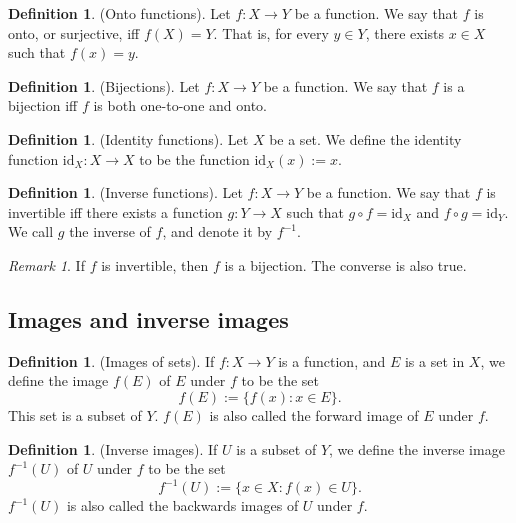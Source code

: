 \documentclass[12pt]{article}
\theoremstyle{definition}
\newtheorem{definition}[theorem]{Definition}
\theoremstyle{remark}
\newtheorem*{remark}{Remark}
\begin{document}
\begin{definition}
    (Onto functions). Let $f \colon X \to Y$ be a function. We say that $f$ is onto, or surjective, iff $f(X) = Y$. That is, for every $y \in Y$, there exists $x \in X$ such that $f(x) = y$.
\end{definition}

\begin{definition}
    (Bijections). Let $f \colon X \to Y$ be a function. We say that $f$ is a bijection iff $f$ is both one-to-one and onto.
\end{definition}

\begin{definition}
    (Identity functions). Let $X$ be a set. We define the identity function $\text{id}_X \colon X \to X$ to be the function $\text{id}_X(x) := x$.
\end{definition}

\begin{definition}
    (Inverse functions). Let $f \colon X \to Y$ be a function. We say that $f$ is invertible iff there exists a function $g \colon Y \to X$ such that $g \circ f = \text{id}_X$ and $f \circ g = \text{id}_Y$. We call $g$ the inverse of $f$, and denote it by $f^{-1}$.
\end{definition}

\begin{remark}
    If $f$ is invertible, then $f$ is a bijection. The converse is also true. 
\end{remark}

\subsection{Images and inverse images}

\begin{definition}
    (Images of sets). If $f \colon X \to Y$ is a function, and $E$ is a set in $X$, we define the image $f(E)$ of $E$ under $f$ to be the set \[
        f(E) := \{f(x) \colon x \in E\}
    .\]
    This set is a subset of $Y$. $f(E)$ is also called the forward image of $E$ under $f$.
\end{definition}

\begin{definition}
    (Inverse images). If $U$ is a subset of $Y$, we define the inverse image $f^{-1}(U)$ of $U$ under $f$ to be the set \[
        f^{-1}(U) := \{x \in X \colon f(x) \in U\}
    .\]
    $f^{-1}(U)$ is also called the backwards images of $U$ under $f$.
\end{definition}
\end{document}
